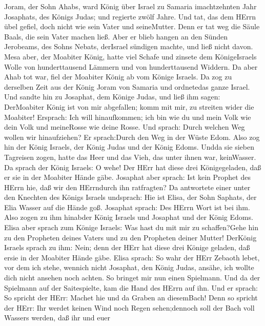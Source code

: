  Joram, der Sohn Ahabs, ward König über Israel zu Samaria
imachtzehnten Jahr Josaphats, des Königs Judas; und regierte zwölf
Jahre.  Und tat, das dem HErrn übel gefiel, doch nicht wie
sein Vater und seineMutter. Denn er tat weg die Säule Baals, die sein
Vater machen ließ.  Aber er blieb hangen an den Sünden
Jerobeams, des Sohns Nebats, derIsrael sündigen machte, und ließ nicht
davon.  Mesa aber, der Moabiter König, hatte viel Schafe und
zinsete dem KönigeIsraels Wolle von hunderttausend Lämmern und von
hunderttausend Widdern.  Da aber Ahab tot war, fiel der
Moabiter König ab vom Könige Israels.  Da zog zu derselben
Zeit aus der König Joram von Samaria und ordnetedas ganze Israel.
 Und sandte hin zu Josaphat, dem Könige Judas, und ließ ihm
sagen: DerMoabiter König ist von mir abgefallen; komm mit mir, zu
streiten wider die Moabiter! Ersprach: Ich will hinaufkommen; ich bin
wie du und mein Volk wie dein Volk und meineRosse wie deine Rosse.
 Und sprach: Durch welchen Weg wollen wir hinaufziehen? Er
sprach:Durch den Weg in der Wüste Edom.  Also zog hin der
König Israels, der König Judas und der König Edoms. Undda sie sieben
Tagreisen zogen, hatte das Heer und das Vieh, das unter ihnen war,
keinWasser.  Da sprach der König Israels: O wehe! Der HErr
hat diese drei Königegeladen, daß er sie in der Moabiter Hände gäbe.
 Josaphat aber sprach: Ist kein Prophet des HErrn hie, daß
wir den HErrndurch ihn ratfragten? Da antwortete einer unter den
Knechten des Königs Israels undsprach: Hie ist Elisa, der Sohn Saphats,
der Elia Wasser auf die Hände goß.  Josaphat sprach: Des
HErrn Wort ist bei ihm. Also zogen zu ihm hinabder König Israels und
Josaphat und der König Edoms.  Elisa aber sprach zum Könige
Israels: Was hast du mit mir zu schaffen?Gehe hin zu den Propheten
deines Vaters und zu den Propheten deiner Mutter! DerKönig Israels
sprach zu ihm: Nein; denn der HErr hat diese drei Könige geladen, daß
ersie in der Moabiter Hände gäbe.  Elisa sprach: So wahr
der HErr Zebaoth lebet, vor dem ich stehe, wennich nicht Josaphat, den
König Judas, ansähe, ich wollte dich nicht ansehen noch achten.
 So bringet mir nun einen Spielmann. Und da der Spielmann
auf der Saitespielte, kam die Hand des HErrn auf ihn.  Und
er sprach: So spricht der HErr: Machet hie und da Graben an diesemBach!
 Denn so spricht der HErr: Ihr werdet keinen Wind noch
Regen sehen;dennoch soll der Bach voll Wassers werden, daß ihr und euer
